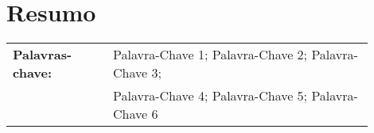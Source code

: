 \chapter*{Resumo}


\lipsum[1-2]

%
\vfill
%
{\centering %
\begin{tabular}{p{0.25\linewidth} p{0.65\linewidth}}
	\textbf{\Large Palavras-chave:} & Palavra-Chave 1; Palavra-Chave 2; Palavra-Chave 3; \\%
									& Palavra-Chave 4; Palavra-Chave 5; Palavra-Chave 6    %
\end{tabular}
}